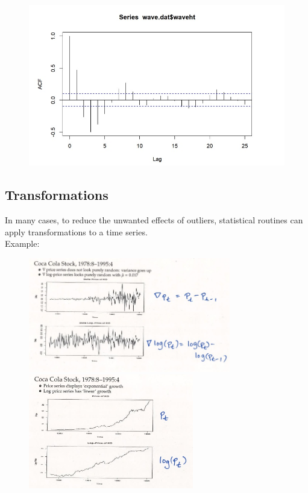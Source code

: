\begin{figure}[H]
\includegraphics[scale=0.4]{images/Screenshot 2024-03-30 at 17.42.36.jpg}
\centering
\end{figure}


\subsection{Transformations}

In many cases, to reduce the unwanted effects of outliers, statistical routines can apply transformations to a time series.\\

Example:

\begin{figure}[H]
  \centering
  \begin{minipage}{0.49\textwidth}
    \includegraphics[height=5cm]{images/Screenshot 2024-03-30 at 17.45.04.jpg} %
  \end{minipage}\hfill
  \begin{minipage}{0.49\textwidth}
    \includegraphics[height=5cm]{images/Screenshot 2024-03-30 at 17.46.58.jpg} %
  \end{minipage}
\end{figure}



